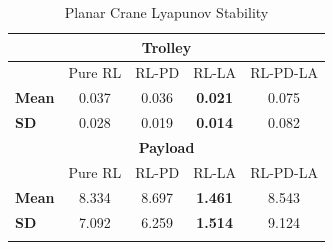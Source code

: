 %
\begin{table}[h!]
  \begin{center}
    \setlength{\tabcolsep}{6pt}
    \caption{Planar Crane Lyapunov Stability}
    \begin{tabular}{ l c c c c }
    \hline\hline
    \multicolumn{5}{c}{\textbf{Trolley}}\\
    \hline
    & Pure RL & RL-PD & RL-LA & RL-PD-LA\\
    \hline
    \textbf{Mean} & 0.037 & 0.036 & \textbf{0.021} & 0.075\\
    \textbf{SD}  & 0.028 & 0.019 & \textbf{0.014} & 0.082\\ 
    \hline\hline
    \multicolumn{5}{c}{\textbf{Payload}}\\
    \hline
    & Pure RL & RL-PD & RL-LA & RL-PD-LA\\
    \hline
    \textbf{Mean} & 8.334 & 8.697 & \textbf{1.461} & 8.543\\
    \textbf{SD}  & 7.092 & 6.259 & \textbf{1.514} & 9.124\\ 
    \hline
    \label{table:dpcrane_Lyapunov_stablility}
    \end{tabular}
    \vspace{-0.2in}
    \end{center}
  \end{table}
%

